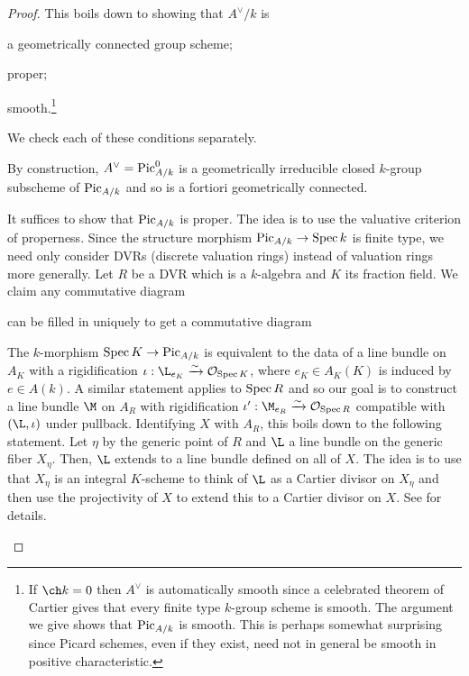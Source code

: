 \documentclass[11pt]{article}
\begin{document}
\begin{proof}
This boils down to showing that $A^{\vee}/k$ is
\begin{enum}{\roman}
\item a geometrically connected group scheme;
\item proper;
\item smooth.\footnote{If $\ch k=0$ then $A^{\vee}$ is automatically smooth since a celebrated theorem of Cartier gives that every finite type $k$-group scheme is smooth. The argument we give shows that $\operatorname{Pic}_{A/k}$ is smooth. This is perhaps somewhat surprising since Picard schemes, even if they exist, need not in general be smooth in positive characteristic.}
\end{enum}

We check each of these conditions separately.

\begin{enum}{\roman}
\item By construction, $A^{\vee}=\operatorname{Pic}_{A/k}^0$ is a geometrically irreducible closed $k$-group subscheme of $\operatorname{Pic}_{A/k}$ and so is a fortiori geometrically connected.

\item It suffices to show that $\operatorname{Pic}_{A/k}$ is proper. The idea is to use the valuative criterion of properness. Since the structure morphism $\operatorname{Pic}_{A/k}\to\operatorname{Spec} k$ is finite type, we need only consider DVRs (discrete valuation rings) instead of valuation rings more generally. Let $R$ be a DVR which is a $k$-algebra and $K$ its fraction field. We claim any commutative diagram 
\begin{center}
\end{center}
can be filled in uniquely to get a commutative diagram
\begin{center}
\end{center}
The $k$-morphism $\operatorname{Spec} K\to\operatorname{Pic}_{A/k}$ is equivalent to the data of a line bundle on $A_K$ with a rigidification $\iota: \L_{e_K}\xto{\sim}\O_{\Spec K}$, where $e_K\in A_K(K)$ is induced by $e\in A(k)$. A similar statement applies to $\operatorname{Spec} R$ and so our goal is to construct a line bundle $\M$ on $A_R$ with rigidification $\iota': \M_{e_R}\xto{\sim}\O_{\Spec R}$ compatible with $(\L,\iota)$ under pullback. Identifying $X$ with $A_R$, this boils down to the following statement. Let $\eta$ by the generic point of $R$ and $\L$  a line bundle on the generic fiber $X_{\eta}$. Then, $\L$ extends to a line bundle defined on all of $X$. The idea is to use that $X_{\eta}$ is an integral $K$-scheme to think of $\L$ as a Cartier divisor on $X_{\eta}$ and then use the projectivity of $X$ to extend this to a Cartier divisor on $X$. See \cite{Extension} for details.


\end{enum}
\end{proof}
\end{document}
